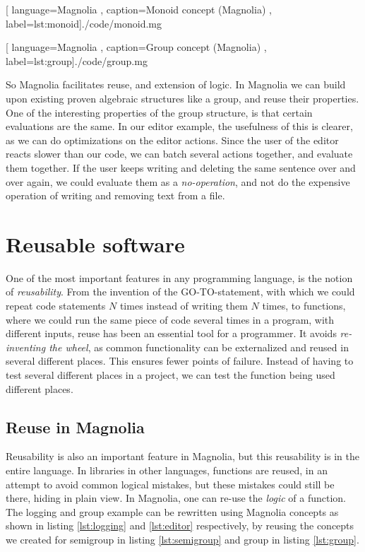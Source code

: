 \begin{center}
  
    [ language=Magnolia
    , caption={Monoid concept (Magnolia)}
    , label=lst:monoid]{./code/monoid.mg}
\end{center}

\begin{center}
  
    [ language=Magnolia
    , caption={Group concept (Magnolia)}
    , label=lst:group]{./code/group.mg}
\end{center}

So Magnolia facilitates reuse, and extension of logic. In Magnolia we can build
upon existing proven algebraic structures like a group, and reuse their
properties. One of the interesting properties of the group structure, is that
certain evaluations are the same. In our editor example, the usefulness of this
is clearer, as we can do optimizations on the editor actions. Since the user of
the editor reacts slower than our code, we can batch several actions together,
and evaluate them together. If the user keeps writing and deleting the same
sentence over and over again, we could evaluate them as a
\textit{no-operation}, and not do the expensive operation of writing and
removing text from a file.

\section{Reusable software}

One of the most important features in any programming language, is the notion
of \textit{reusability}. From the invention of the GO-TO-statement, with which
we could repeat code statements $N$ times instead of writing them $N$ times, to
functions, where we could run the same piece of code several times in a
program, with different inputs, reuse has been an essential tool for a
programmer. It avoids \textit{re-inventing the wheel}, as common functionality
can be externalized and reused in several different places. This ensures
fewer points of failure. Instead of having to test several different places in
a project, we can test the function being used different places.

\subsection{Reuse in Magnolia}

Reusability is also an important feature in Magnolia, but this reusability is in
the entire language. In libraries in other languages, functions are reused, in
an attempt to avoid common logical mistakes, but these mistakes could still be
there, hiding in plain view. In Magnolia, one can re-use the \textit{logic} of a
function. The logging and group example can be rewritten using Magnolia concepts
as shown in listing \ref{lst:logging} and \ref{lst:editor} respectively, by
reusing the concepts we created for semigroup in listing \ref{lst:semigroup} and group
in listing \ref{lst:group}.

